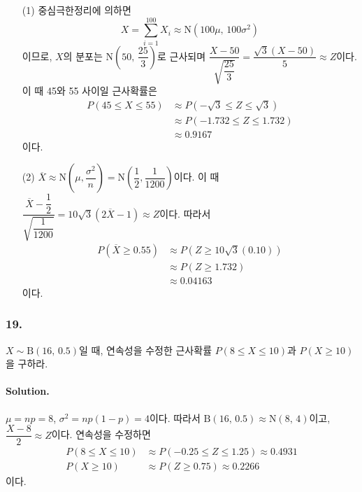 \begin{itemize}
	\item [(1)] {
		중심극한정리에 의하면
		\[X=\sum_{i=1}^{100} X_i \approx \mathrm{N}\left(100\mu,\,100\sigma^2\right)\]
		이므로, $X$의 분포는 $\mathrm{N}\left(50,\,\dfrac{25}{3}\right)$로 근사되며
		$\dfrac{X-50}{\sqrt{\dfrac{25}{3}}}=\dfrac{\sqrt{3}\left(X-50\right)}{5}\approx Z$이다. 이 때 45와 55 사이일 근사확률은
		\begin{align*}
			P\left(45\leq X\leq 55\right) &\approx P\left(-\sqrt{3} \leq Z \leq \sqrt{3}\right) \\
			&\approx P\left(-1.732 \leq Z \leq 1.732\right) \\
			&\approx 0.9167
		\end{align*}
		이다.
	}
	\item [(2)] {
		$\overline{X} \approx \mathrm{N}\left(\mu, \dfrac{\sigma^2}{n}\right) = \mathrm{N}\left(\dfrac{1}{2}, \dfrac{1}{1200}\right)$이다.
		이 때 $\dfrac{\overline{X}-\dfrac{1}{2}}{\sqrt{\dfrac{1}{1200}}} = 10\sqrt{3} \left(2\overline{X}-1\right) \approx Z$이다. 따라서
		\begin{align*}
			P\left(\overline{X} \geq 0.55\right) &\approx P\left(Z \geq 10\sqrt{3} \left(0.10\right)\right) \\
			&\approx P\left(Z \geq 1.732\right) \\
			&\approx 0.04163
		\end{align*}
		이다.
	}
\end{itemize}


\subsubsection{19.} $X\sim\mathrm{B}\left(16,\,0.5\right)$일 때, 연속성을 수정한 근사확률
$P\left(8\leq X\leq10\right)$과 $P\left(X\geq10\right)$을 구하라.

\paragraph{Solution.} $\mu = np = 8$, $\sigma^2 = np\left(1-p\right) = 4$이다.
따라서 $\mathrm{B}\left(16,\,0.5\right) \approx \mathrm{N}\left(8,\,4\right)$이고, $\dfrac{X-8}{2} \approx Z$이다. 연속성을 수정하면
\begin{align*}
	P\left(8\leq X\leq 10\right) &\approx P\left(-0.25\leq Z\leq 1.25\right) \approx 0.4931 \\
	P\left(X\geq 10\right) &\approx P\left(Z\geq 0.75\right) \approx 0.2266
\end{align*}
이다.

